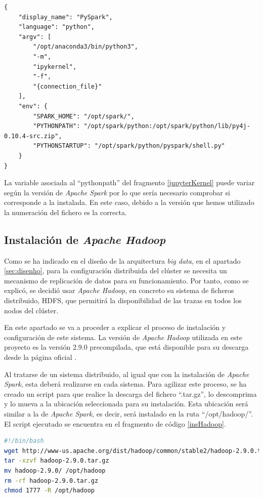 \begin{lstlisting}[label=jupyterKernel,frame=single,caption=Contenido del fichero ``kernel.json'' para la configuración con \textit{Apache Spark}.]
{
	"display_name": "PySpark",
	"language": "python",
	"argv": [
		"/opt/anaconda3/bin/python3",
		"-m",
		"ipykernel",
		"-f",
		"{connection_file}"
	],
	"env": {
		"SPARK_HOME": "/opt/spark/",
		"PYTHONPATH": "/opt/spark/python:/opt/spark/python/lib/py4j-0.10.4-src.zip",
		"PYTHONSTARTUP": "/opt/spark/python/pyspark/shell.py"
	}
}
\end{lstlisting}

La variable asociada al ``pythonpath'' del fragmento \ref{jupyterKernel} puede variar según la versión de \textit{Apache Spark} por lo que sería necesario comprobar si corresponde a la instalada. En este caso, debido a la versión que hemos utilizado la numeración del fichero es la correcta.

\clearpage
\subsection{Instalación de \textit{Apache Hadoop}\label{hadoopCluster}}

Como se ha indicado en el diseño de la arquitectura \textit{big data}, en el apartado \ref{sec:disenho}, para la configuración distribuida del clúster se necesita un mecanismo de replicación de datos para su funcionamiento. Por tanto, como se explicó, se decidió usar \textit{Apache Hadoop}, en concreto su sistema de ficheros distribuido, \gls{HDFS}, que permitirá la disponibilidad de las trazas en todos los nodos del clúster.

En este apartado se va a proceder a explicar el proceso de instalación y configuración de este sistema. La versión de \textit{Apache Hadoop} utilizada en este proyecto es la versión 2.9.0 precompilada, que está disponible para su descarga desde la página oficial \cite{descargaHadoop}.

Al tratarse de un sistema distribuido, al igual que con la instalación de \textit{Apache Spark}, esta deberá realizarse en cada sistema. Para agilizar este proceso, se ha creado un script para que realice la descarga del fichero ``.tar.gz'', lo descomprima y lo mueva a la ubicación seleccionada para su instalación. Esta ubicación será similar a la de \textit{Apache Spark}, es decir, será instalado en la ruta ``/opt/hadoop/''. El script ejecutado se encuentra en el fragmento de código \ref{insHadoop}.


\begin{lstlisting}[label=insHadoop,language=sh,frame=single,caption=Script de instalación de \textit{Apache Hadoop}.]
#!/bin/bash
wget http://www-us.apache.org/dist/hadoop/common/stable2/hadoop-2.9.0.tar.gz
tar -xzvf hadoop-2.9.0.tar.gz
mv hadoop-2.9.0/ /opt/hadoop
rm -rf hadoop-2.9.0.tar.gz
chmod 1777 -R /opt/hadoop
\end{lstlisting}

